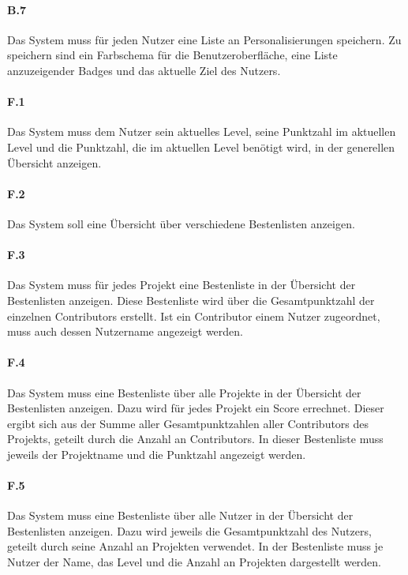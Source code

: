 \documentclass[
	oneside,  %
	ngerman, 
	final, 
	11pt, 
	a4paper, 
	1.1headlines, 
	headinclude=false, 
	footinclude=false, 
	mpinclude=false, 
	pagesize, 
	onecolumn, 
	titlepage, 
	parskip=half, 
	headsepline, 
	chapterprefix=false, 
	version=first, 
	listof=totoc, 
	bibliography=totoc, 
	toc=graduated, 
	fleqn
]{scrbook}
\begin{document}
\paragraph{B.7}
Das System muss für jeden Nutzer eine Liste an Personalisierungen speichern.
Zu speichern sind ein Farbschema für die Benutzeroberfläche, eine Liste anzuzeigender Badges und das aktuelle Ziel des Nutzers.

\paragraph{F.1}
Das System muss dem Nutzer sein aktuelles Level, seine Punktzahl im aktuellen Level und die Punktzahl, die im aktuellen Level benötigt wird, in der generellen Übersicht anzeigen.

\paragraph{F.2}
Das System soll eine Übersicht über verschiedene Bestenlisten anzeigen.

\paragraph{F.3}
Das System muss für jedes Projekt eine Bestenliste in der Übersicht der Bestenlisten anzeigen.
Diese Bestenliste wird über die Gesamtpunktzahl der einzelnen Contributors erstellt.
Ist ein Contributor einem Nutzer zugeordnet, muss auch dessen Nutzername angezeigt werden.

\paragraph{F.4}
Das System muss eine Bestenliste über alle Projekte in der Übersicht der Bestenlisten anzeigen.
Dazu wird für jedes Projekt ein Score errechnet.
Dieser ergibt sich aus der Summe aller Gesamtpunktzahlen aller Contributors des Projekts, geteilt durch die Anzahl an Contributors.
In dieser Bestenliste muss jeweils der Projektname und die Punktzahl angezeigt werden.

\paragraph{F.5}
Das System muss eine Bestenliste über alle Nutzer in der Übersicht der Bestenlisten anzeigen.
Dazu wird jeweils die Gesamtpunktzahl des Nutzers, geteilt durch seine Anzahl an Projekten verwendet.
In der Bestenliste muss je Nutzer der Name, das Level und die Anzahl an Projekten dargestellt werden.
\end{document}
